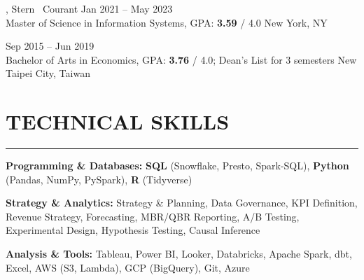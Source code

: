 \documentclass[11pt,letterpaper]{article}
\begin{document}
\vspace{2pt}
, Stern \textbar\ Courant \hfill Jan 2021 -- May 2023\\[-1pt]
Master of Science in Information Systems, GPA: \textbf{3.59} / 4.0 \hfill New York, NY

\vspace{2pt}  %
 \hfill Sep 2015 -- Jun 2019\\[-1pt]
Bachelor of Arts in Economics, GPA: \textbf{3.76} / 4.0; Dean's List for 3 semesters \hfill New Taipei City, Taiwan

\vspace{0.5\baselineskip}  %
\section*{TECHNICAL SKILLS}
\vspace{-8pt}\noindent\rule{\textwidth}{0.8pt}

\vspace{2pt}
\noindent\textbf{Programming \& Databases:} \textbf{SQL} (Snowflake, Presto, Spark-SQL), \textbf{Python} (Pandas, NumPy, PySpark), \textbf{R} (Tidyverse)

\vspace{2pt}
\noindent\textbf{Strategy \& Analytics:} Strategy \& Planning, Data Governance, KPI Definition, Revenue Strategy, Forecasting, MBR/QBR Reporting, A/B Testing, Experimental Design, Hypothesis Testing, Causal Inference

\vspace{2pt}
\noindent\textbf{Analysis \& Tools:} Tableau, Power BI, Looker, Databricks, Apache Spark, dbt, Excel, AWS (S3, Lambda), GCP (BigQuery), Git, Azure
\end{document}
